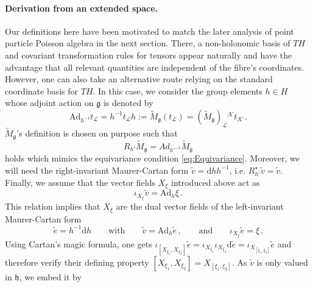 \documentclass[11pt,a4paper]{article}
\numberwithin{equation}{section}
\newcommand{\commentO}[1]{ {\color{blue}  [{\bf O: #1}]}}
\begin{document}
\paragraph{Derivation from an extended space.}
Our definitions here have been motivated to match the later analysis of point particle Poisson algebra in the next section. There, a non-holonomic basis of $T H$ and covariant transformation rules for tensors appear naturally and have the advantage that all relevant quantities are independent of the fibre's coordinates. However, one can also take an alternative route relying on the standard coordinate basis for $T H$. In this case, we consider the group elements $h \in H$ whose adjoint action on $\mathfrak{g}$ is denoted by
\begin{equation}\label{eq:DefTildeMg}
  \mathrm{Ad}_{h^{-1}} t_{\mathcal{L}} = h^{-1} t_{\mathcal{L}} h := \widetilde{M}_{\mathfrak{g}}(t _\mathcal{L}) = (\widetilde{M}_{\mathfrak{g}})_{\mathcal{L}}{}^{\mathcal{K}} t_{\mathcal{K}}\,.
\end{equation}
$\widetilde{M}_{\mathfrak{g}}$'s definition is chosen on purpose such that
\begin{equation}
  R_{h'} \widetilde{M}_{\mathfrak{g}} = Ad_{h'^{-1}} \widetilde{M}_{\mathfrak{g}}
\end{equation}
holds which mimics the equivariance condition \eqref{eq:Equivariance}. Moreover, we will need the right-invariant Maurer-Cartan form $\widetilde v = \mathrm{d} h h^{-1} $, i.e. $R^\star_{h'} \widetilde{v} = \widetilde{v}$.
Finally, we assume that the vector fields $X_\xi$ introduced above act as
\begin{equation}
  \iota_{X_\xi} \widetilde{v} = \mathrm{Ad}_h \xi\,.
\end{equation}
This relation implies that $X_\xi$ are the dual vector fields of the left-invariant Maurer-Cartan form
\begin{equation}
  \widetilde{e} = h^{-1} \mathrm{d} h
  \qquad \text{with} \qquad
  \widetilde{v} = \mathrm{Ad}_h \widetilde{e}\,,
  \qquad \text{and} \qquad
  \iota_{X_\xi} \widetilde{e} = \xi\,.
\end{equation}
Using Cartan's magic formula, one gets $\iota_{[ X_{\xi_1}, X_{\xi_2} ]} \widetilde{e} = \iota_{X_{\xi_1}} \iota_{X_{\xi_2}} \mathrm{d} \widetilde{e} = \iota_{X_{[\xi_1, \xi_2]} } \widetilde{e}$ and therefore verify their defining property $[ X_{\xi_1}, X_{\xi_2}] = X_{[\xi_1, \xi_2]}$. As $\widetilde v$ is only valued in $\mathfrak{h}$, we embed it by
\end{document}
